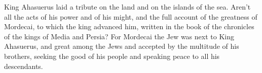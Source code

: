 \mychapter{}\myverse*{}King Ahasuerus laid a tribute on the land and on the islands of
the sea.
\myverse{}Aren’t all the acts of his power and of his might, and the full account of
the greatness of Mordecai, to which the king advanced him, written in the book of the chronicles of the
kings of Media and Persia?
\myverse{}For Mordecai the Jew was next to King Ahasuerus, and great among the Jews and
accepted by the multitude of his brothers, seeking the good of his people and speaking peace to all his
descendants.



